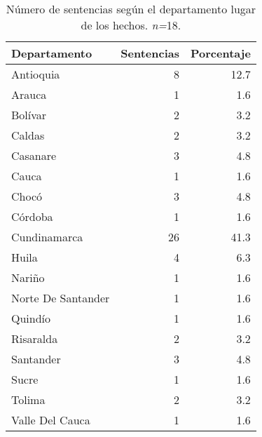 \begin{table}[!htbp]
\centering
\caption{Número de sentencias según el departamento lugar de los hechos. \textit{n=}18.} 
\label{tab:dephec}
\begin{tabular}{lrr}
  \hline
Departamento & Sentencias & Porcentaje \\ 
  \hline
Antioquia &  8 & 12.7 \\ 
  Arauca &  1 & 1.6 \\ 
  Bolívar &  2 & 3.2 \\ 
  Caldas &  2 & 3.2 \\ 
  Casanare &  3 & 4.8 \\ 
  Cauca &  1 & 1.6 \\ 
  Chocó &  3 & 4.8 \\ 
  Córdoba &  1 & 1.6 \\ 
  Cundinamarca & 26 & 41.3 \\ 
  Huila &  4 & 6.3 \\ 
  Nariño &  1 & 1.6 \\ 
  Norte De Santander &  1 & 1.6 \\ 
  Quindío &  1 & 1.6 \\ 
  Risaralda &  2 & 3.2 \\ 
  Santander &  3 & 4.8 \\ 
  Sucre &  1 & 1.6 \\ 
  Tolima &  2 & 3.2 \\ 
  Valle Del Cauca &  1 & 1.6 \\ 
   \hline
\end{tabular}
\end{table}
